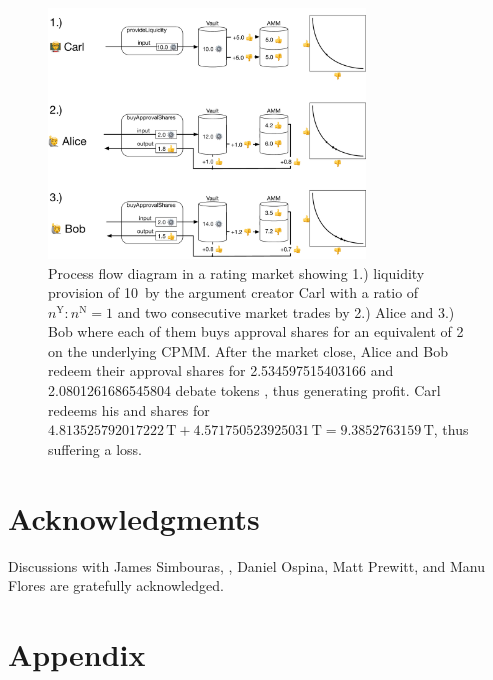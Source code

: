 \documentclass[%
aip,
amsmath,amssymb,
reprint,%
unsortedaddress,
nofootinbib
]{revtex4-2}
\newcommand{\T}{\text{T}}
\newcommand{\Y}{\text{Y}}
\newcommand{\N}{\text{N}}
\begin{document}
\begin{figure}
	\includegraphics[width=0.75\textwidth]{Graphics/RatingMarket.pdf}
	\caption{Process flow diagram in a rating market showing
		1.) liquidity provision of 10\,\T{} by the argument creator Carl with a ratio of $n^\Y:n^\N=1$
		and 
		two consecutive market trades by 
		2.) Alice and 
		3.) Bob where each of them buys approval shares for an equivalent of 2\,\T{} on the underlying \ac{CPMM}.
		After the market close, 
		Alice and Bob redeem their approval shares \Y{} for \num[round-mode=places,round-precision=1]{2.534597515403166}
		and
		\num[round-mode=places,round-precision=1]{2.0801261686545804}
		debate tokens \T{}, thus generating profit.
		Carl redeems his \Y{} and \N{} shares for
		$\num[round-mode=places,round-precision=1]{4.813525792017222}\,\T
		+\num[round-mode=places,round-precision=1]{4.571750523925031}\,\T
		=\num[round-mode=places,round-precision=1]{9.3852763159}\,\T$, thus suffering a loss.
	}
	\label{fig:RatingMarket}
\end{figure}

\section*{Acknowledgments}

Discussions
with 
James Simbouras,
,
Daniel Ospina,
Matt Prewitt, and 
Manu Flores
are gratefully acknowledged.


\section*{Appendix}
\end{document}
